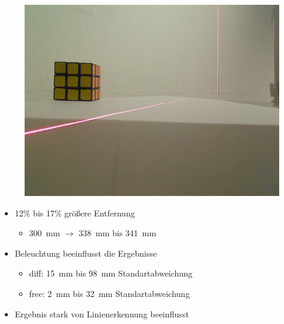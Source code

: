 \documentclass[xcolor=dvipsnames]{beamer}
\begin{document}
\begin{frame}
\begin{figure}
\begin{minipage}{0.32\linewidth}
			\includegraphics[width=\linewidth]{includes/test_repeat_3}
		\end{minipage}
	\end{figure}

	\begin{itemize}
		\item 12\% bis 17\% größere Entfernung
		\begin{itemize}
			\item 300~mm $\rightarrow$ 338~mm bis 341~mm
		\end{itemize}
		\item Beleuchtung beeinflusst die Ergebnisse
		\begin{itemize}
			\item diff: 15~mm bis 98~mm Standartabweichung
			\item free: 2~mm bis 32~mm Standartabweichung
		\end{itemize}
		\item Ergebnis stark von Linienerkennung beeinflusst
	\end{itemize}

\end{frame}

\end{document}
